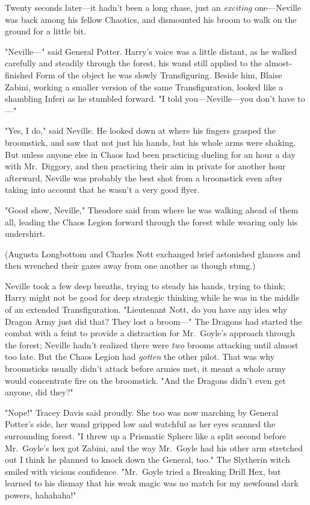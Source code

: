 Twenty seconds later---it hadn't been a long chase, just an \emph{exciting}
one---Neville was back among his fellow Chaotics, and dismounted his broom to
walk on the ground for a little bit.

"Neville---" said General Potter. Harry's voice was a little distant, as he
walked carefully and steadily through the forest, his wand still applied to the
almost-finished Form of the object he was slowly Transfiguring. Beside him,
Blaise Zabini, working a smaller version of the same Transfiguration, looked
like a shambling Inferi as he stumbled forward. "I told you---Neville---you
don't have to---"

"Yes, I do," said Neville. He looked down at where his fingers grasped the
broomstick, and saw that not just his hands, but his whole arms were shaking.
But unless anyone else in Chaos had been practicing dueling for an hour a day
with Mr.~Diggory, and then practicing their aim in private for another hour
afterward, Neville was probably the best shot from a broomstick even after
taking into account that he wasn't a very good flyer.

"Good show, Neville," Theodore said from where he was walking ahead of them
all, leading the Chaos Legion forward through the forest while wearing only his
undershirt.

(Augusta Longbottom and Charles Nott exchanged brief astonished glances and
then wrenched their gazes away from one another as though stung.)

Neville took a few deep breaths, trying to steady his hands, trying to think;
Harry might not be good for deep strategic thinking while he was in the middle
of an extended Transfiguration. "Lieutenant Nott, do you have any idea why
Dragon Army just did that? They lost a broom---" The Dragons had started the
combat with a feint to provide a distraction for Mr.~Goyle's approach through
the forest; Neville hadn't realized there were \emph{two} brooms attacking
until almost too late. But the Chaos Legion had \emph{gotten} the other pilot.
That was why broomsticks usually didn't attack before armies met, it meant a
whole army would concentrate fire on the broomstick. "And the Dragons didn't
even get anyone, did they?"

"Nope!" Tracey Davis said proudly. She too was now marching by General Potter's
side, her wand gripped low and watchful as her eyes scanned the surrounding
forest. "I threw up a Prismatic Sphere like a split second before Mr.~Goyle's
hex got Zabini, and the way Mr.~Goyle had his other arm stretched out I think
he planned to knock down the General, too." The Slytherin witch smiled with
vicious confidence. "Mr.~Goyle tried a Breaking Drill Hex, but learned to his
dismay that his weak magic was no match for my newfound dark powers, hahahaha!"

